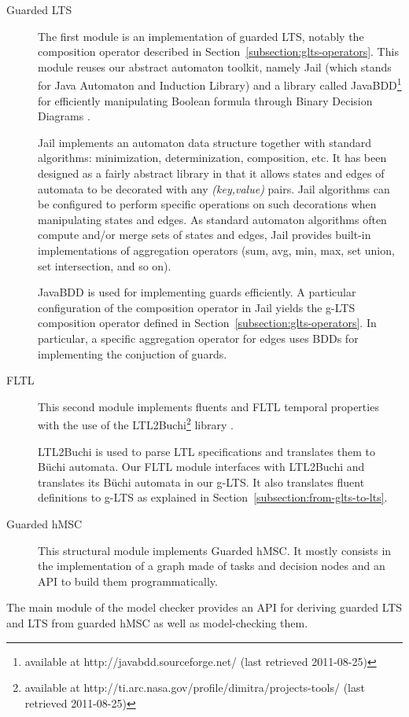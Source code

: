 \begin{description}
\item[Guarded LTS] The first module is an implementation of guarded LTS, notably the composition operator described in Section~\ref{subsection:glts-operators}. This module reuses our abstract automaton toolkit, namely Jail (which stands for Java Automaton and Induction Library) and a library called JavaBDD\footnote{available at http://javabdd.sourceforge.net/ (last retrieved 2011-08-25)} for efficiently manipulating Boolean formula through Binary Decision Diagrams \cite{Bryant:1986}.

Jail implements an automaton data structure together with standard algorithms:  minimization, determinization, composition, etc. It has been designed as a fairly abstract library in that it allows states and edges of automata to be decorated with any \emph{(key,value)} pairs. Jail algorithms can be configured to perform specific operations on such decorations when manipulating states and edges. As standard automaton algorithms often compute and/or merge sets of states and edges, Jail provides built-in implementations of aggregation operators (sum, avg, min, max, set union, set intersection, and so on).

JavaBDD is used for implementing guards efficiently. A particular configuration of the composition operator in Jail yields the g-LTS composition operator defined in Section~\ref{subsection:glts-operators}. In particular, a specific aggregation operator for edges uses BDDs for implementing the conjuction of guards.

\item[FLTL] This second module implements fluents and FLTL temporal properties with the use of the LTL2Buchi\footnote{available at http://ti.arc.nasa.gov/profile/dimitra/projects-tools/ (last retrieved 2011-08-25)} library \cite{Giannakopoulou:2002}. 

LTL2Buchi is used to parse LTL specifications and translates them to B\"uchi automata. Our FLTL module interfaces with LTL2Buchi and translates its B\"uchi automata in our g-LTS. It also translates fluent definitions to g-LTS as explained in Section~\ref{subsection:from-glts-to-lts}.

\item[Guarded hMSC] This structural module implements Guarded hMSC. It mostly consists in the implementation of a graph made of tasks and decision nodes and an API to build them programmatically.
\end{description}

The main module of the model checker provides an API for deriving guarded LTS and LTS from guarded hMSC as well as model-checking them. 
